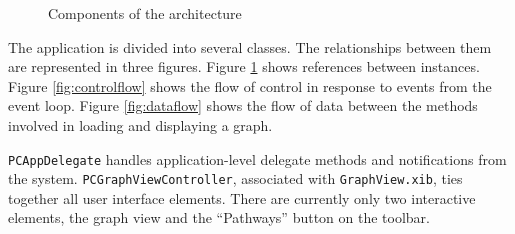 \begin{figure}[htb]
    \caption{\label{fig:components} Components of the architecture}
\end{figure}

The application is divided into several classes. The relationships between them are represented in three figures. Figure \ref{fig:components} shows references between instances. Figure \ref{fig:controlflow} shows the flow of control in response to events from the event loop. Figure \ref{fig:dataflow} shows the flow of data between the methods involved in loading and displaying a graph.

\texttt{PCAppDelegate} handles application-level delegate methods and notifications from the system.  \texttt{PCGraphViewController}, associated with \texttt{GraphView.xib}, ties together all user interface elements. There are currently only two interactive elements, the graph view and the ``Pathways'' button on the toolbar.

